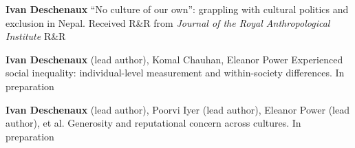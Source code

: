 


\begin{cvpublications}

  \cvpublication
  {\textbf{Ivan Deschenaux}}
  {``No culture of our own'': grappling with cultural politics and exclusion in Nepal. Received R\&R from \textit{Journal of the Royal Anthropological Institute}} %
  {R\&R} %

  \cvpublication
  {\textbf{Ivan Deschenaux} (lead author), Komal Chauhan, Eleanor Power}
  {Experienced social inequality: individual-level measurement and within-society differences.} %
  {In preparation} %

  \cvpublication
  {\textbf{Ivan Deschenaux} (lead author), Poorvi Iyer (lead author), Eleanor Power (lead author), et al.}
  {Generosity and reputational concern across cultures.} %
  {In preparation} %




\end{cvpublications}


